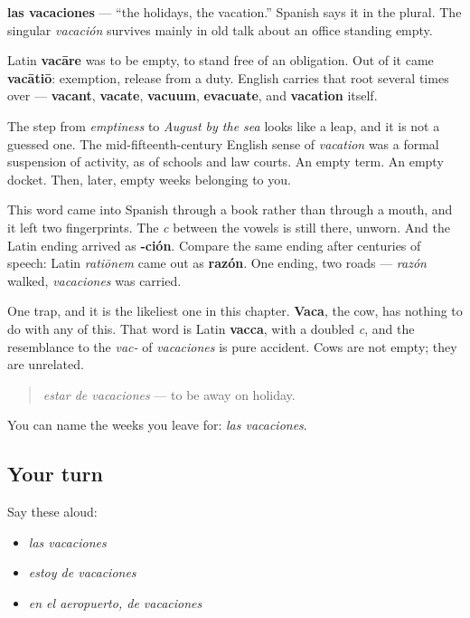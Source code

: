\begin{cousinweb}
\textbf{las vacaciones} — \textquotedblleft{}the holidays, the vacation.\textquotedblright{} Spanish says it in the plural. The singular \emph{vacación} survives mainly in old talk about an office standing empty.

Latin \textbf{vacāre} was to be empty, to stand free of an obligation. Out of it came \textbf{vacātiō}: exemption, release from a duty. English carries that root several times over — \textbf{vacant}, \textbf{vacate}, \textbf{vacuum}, \textbf{evacuate}, and \textbf{vacation} itself.

The step from \emph{emptiness} to \emph{August by the sea} looks like a leap, and it is not a guessed one. The mid-fifteenth-century English sense of \emph{vacation} was a formal suspension of activity, as of schools and law courts. An empty term. An empty docket. Then, later, empty weeks belonging to you.

This word came into Spanish through a book rather than through a mouth, and it left two fingerprints. The \emph{c} between the vowels is still there, unworn. And the Latin ending arrived as \textbf{-ción}. Compare the same ending after centuries of speech: Latin \emph{ratiōnem} came out as \textbf{razón}. One ending, two roads — \emph{razón} walked, \emph{vacaciones} was carried.

One trap, and it is the likeliest one in this chapter. \textbf{Vaca}, the cow, has nothing to do with any of this. That word is Latin \textbf{vacca}, with a doubled \emph{c}, and the resemblance to the \emph{vac-} of \emph{vacaciones} is pure accident. Cows are not empty; they are unrelated.

\begin{quote}
\emph{estar de vacaciones} — to be away on holiday.
\end{quote}
\end{cousinweb}

\begin{grammarlens}[title={What you've built}]
You can name the weeks you leave for: \emph{las vacaciones}.
\end{grammarlens}

\subsection*{Your turn}
Say these aloud:

\begin{itemize}
\raggedright
  \item \emph{las vacaciones}
  \item \emph{estoy de vacaciones}
  \item \emph{en el aeropuerto, de vacaciones}
\end{itemize}

